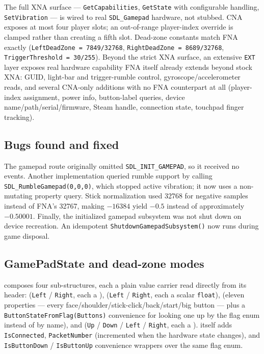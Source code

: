 The full XNA surface --- \texttt{GetCapabilities}, \texttt{GetState} with configurable
 handling, \texttt{SetVibration} --- is wired to real
\texttt{SDL\_Gamepad} hardware, not stubbed. CNA exposes at most four player slots; an
out-of-range player-index override is clamped rather than creating a fifth slot. Dead-zone
constants match FNA exactly
(\texttt{LeftDeadZone = 7849/32768}, \texttt{RightDeadZone = 8689/32768},
\texttt{TriggerThreshold = 30/255}). Beyond the strict XNA surface, an extensive
\texttt{EXT} layer exposes real hardware capability FNA itself already extends beyond stock
XNA: GUID, light-bar and trigger-rumble control, gyroscope/accelerometer reads, and several
CNA-only additions with no FNA counterpart at all (player-index assignment, power info,
button-label queries, device name/path/serial/firmware, Steam handle, connection state,
touchpad finger tracking).

\subsection{Bugs found and fixed}

\begin{historynote}
The gamepad route originally omitted \texttt{SDL\_INIT\_GAMEPAD}, so it received no events.
Another implementation queried rumble support by calling \texttt{SDL\_RumbleGamepad(0,0,0)},
which stopped active vibration; it now uses a non-mutating property query. Stick normalization
used 32768 for negative samples instead of FNA's 32767, making $-16384$ yield $-0.5$ instead of
approximately $-0.50001$. Finally, the initialized gamepad subsystem was not shut down on device
recreation. An idempotent \texttt{ShutdownGamepadSubsystem()} now runs during game disposal.
\end{historynote}

\subsection{GamePadState and dead-zone modes}

 composes four sub-structures, each a plain value carrier read directly
from its header:  (\texttt{Left} / \texttt{Right}, each a
),  (\texttt{Left} / \texttt{Right}, each a scalar
\texttt{float}),  (eleven  properties --- every
face/shoulder/stick-click/back/start/big button --- plus a \texttt{ButtonStateFromFlag(Buttons)}
convenience for looking one up by the  flag enum instead of by name), and
 (\texttt{Up} / \texttt{Down} / \texttt{Left} / \texttt{Right}, each a
).  itself adds \texttt{IsConnected},
\texttt{PacketNumber} (incremented when the hardware state changes), and
\texttt{IsButtonDown} / \texttt{IsButtonUp} convenience
wrappers over the same  flag enum.

